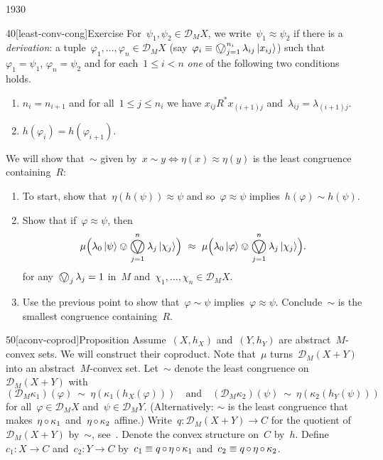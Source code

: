 \begin{parsec}{1930}
\begin{point}{40}[least-conv-cong]{Exercise}
For~$\psi_1,\psi_2 \in \mathcal{D}_M X$,
    we write~$\psi_1 \approx \psi_2$
    if there is a \emph{derivation}: a tuple~$\varphi_1, \ldots, \varphi_n \in \mathcal{D}_M X$
(say~$\varphi_i \equiv \bigovee^{n_i}_{j = 1}  \lambda_{ij}\ket{x_{ij}}$)
such that~$\varphi_1 = \psi_1$, $\varphi_n = \psi_2$ 
    and for each~$1 \leq i<n$ \emph{one} of the following two conditions holds.
\begin{enumerate}
\item
    $n_i = n_{i+1}$
    and for all~$1 \leq j \leq n_i$ we have
    $x_{ij} \mathrel{R^*} x_{(i+1)j}$
    and~$\lambda_{ij}  = \lambda_{(i+1)j}$.
\item
    $h (\varphi_i) = h(\varphi_{i+1})$.
\end{enumerate}
We will show that~$\sim$
    given by~$x \sim y \iff \eta (x) \approx \eta(y)$
    is the least congruence containing~$R$:
\begin{enumerate}
\item
To start, show that~$\eta ( h(\psi)) \approx \psi $
    and so~$\varphi \approx \psi$ implies~$h(\varphi) \sim h(\psi)$.
\item
Show that if~$\varphi \approx \psi$,
    then
    \begin{equation*}
    \mu \Bigl(\lambda_0 \ket{\psi} \ovee \bigovee_{j=1}^n \lambda_j \ket{\chi_j}\Bigr)
    \ \approx  \ 
    \mu \Bigl(\lambda_0 \ket{\varphi} \ovee \bigovee_{j=1}^n \lambda_j \ket{\chi_j}\Bigr).
    \end{equation*}
    for any~$\bigovee_j \lambda_j=1$  in~$M$ and~$\chi_1,\ldots, \chi_n \in \mathcal{D}_M X$.
\item
    Use the previous point to show that~$\varphi \sim \psi$
        implies~$\varphi \approx \psi$.
Conclude~$\sim$ is the smallest congruence containing~$R$.
\end{enumerate}
\spacingfix{}
\end{point}
\begin{point}{50}[aconv-coprod]{Proposition}%
Assume~$(X,h_X)$ and~$(Y,h_Y)$
    are abstract~$M$-convex sets.
    We will construct their coproduct.
Note that~$\mu$ turns~$\mathcal{D}_M (X+Y)$
    into an abstract~$M$-convex set.
Let~$\sim$ denote the least congruence on~$\mathcal{D}_M (X+Y)$
with
\begin{equation}
    (\mathcal{D}_M \kappa_1) (\varphi)
    \ \sim \ \eta(\kappa_1 ( h_X (\varphi)))
    \quad \text{and} \quad
    (\mathcal{D}_M \kappa_2) (\psi)
    \ \sim \ \eta(\kappa_2 ( h_Y (\psi))) \label{congruence-coprod-conv}
\end{equation}
    for all~$\varphi \in \mathcal{D}_M X$
    and~$\psi \in \mathcal{D}_M Y$.
(Alternatively: $\sim$ is the least congruence
    that makes~$\eta \mathop{\circ} \kappa_1$ and~$\eta\mathop{\circ}\kappa_2$ affine.)
Write~$q\colon \mathcal{D}_M (X+Y) \to C$
    for the quotient of~$\mathcal{D}_M(X+Y)$ by~$\sim$, see~.
    Denote the convex structure on~$C$ by~$h$.
Define~$c_1 \colon X \to C$ and~$c_2 \colon Y \to C$
    by~$c_1 \equiv q \mathop{\circ} \eta \mathop{\circ} \kappa_1$
    and~$c_2 \equiv q \mathop{\circ} \eta \mathop{\circ} \kappa_2$.


\end{point}
\end{parsec}
